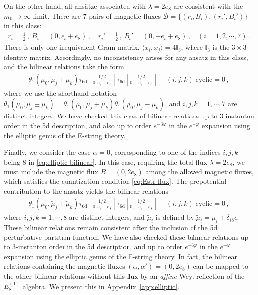 \documentclass[11pt, a4paper]{article}
\newcommand{\tauftnd}[2]{\tau_{\mathrm{6d}}\genfrac[]{0pt}{1}{#1}{#2}}
\theoremstyle{definition}
\begin{document}
On the other hand, all ans\"atze associated with $ \lambda=2e_8 $ are consistent with the $ m_0 \to \infty $ limit. There are 7 pairs of magnetic fluxes $ \mathcal{B} = \{(r_i,B_i), (r_i',B_i')\} $ in this class:
\begin{align}
    r_i = \frac{1}{2} \, , \ B_i = (0, e_i+e_8) \, , \quad
    r_i' = \frac{1}{2} \, , \ B_i' = (0, -e_i+e_8) \, , \quad
    (i = 1,2,\cdots,7) \, .
\end{align}
There is only one inequivalent Gram matrix, $ \langle x_i, x_j \rangle = 4\mathbb{I}_3 $, where $ \mathbb{I}_3 $ is the $ 3\times 3 $ identity matrix. Accordingly, no inconsistency arises for any ansatz in this class, and the bilinear relations take the form
\begin{align}\label{eq:elliptic-bilinear}
    \theta_1(\mu_0, \mu_j\pm \mu_k) \tauftnd{1/2}{0, e_i+e_8} \tauftnd{1/2}{0, -e_i+e_8} + (i,j,k)\text{-cyclic} = 0 \, ,
\end{align}
where we use the shorthand notation $ \theta_1(\mu_0, \mu_j\pm \mu_k) = \theta_1(\mu_0, \mu_j+\mu_k) \theta_1(\mu_0, \mu_j-\mu_k) $, and $ i,j,k=1,\cdots, 7 $ are distinct integers. We have checked this class of bilinear relations up to 3-instanton order in the 5d description, and also up to order $ e^{-3\varphi} $ in the $ e^{-\varphi} $ expansion using the elliptic genus of the E-string theory.

Finally, we consider the case $ \alpha=0 $, corresponding to one of the indices $ i,j,k $ being $ 8 $ in \eqref{eq:elliptic-bilinear}. In this case, requiring the total flux $ \lambda=2e_8 $, we must include the magnetic flux $ B=(0,2e_8) $ among the allowed magnetic fluxes, which satisfies the quantization condition \eqref{eq:Estr-flux}. The prepotential contribution to the ansatz yields the bilinear relations
\begin{align}\label{eq:elliptic-bilinear-affine}
    \theta_1(\mu_0, \tilde{\mu}_j \pm \tilde{\mu}_k) \tauftnd{1/2}{0, e_i+e_8} \tauftnd{1/2}{0, -e_i+e_8} + (i,j,k)\text{-cyclic} = 0 \, ,
\end{align}
where $ i,j,k=1,\cdots,8 $ are distinct integers, and $ \tilde{\mu}_i $ is defined by $ \tilde{\mu}_i=\mu_i + \delta_{i8} \epsilon $. These bilinear relations remain consistent after the inclusion of the 5d perturbative partition function. We have also checked these bilinear relations up to 3-instanton order in the 5d description, and up to order $ e^{-3\varphi} $ in the $ e^{-\varphi} $ expansion using the elliptic genus of the E-string theory. In fact, the bilinear relations containing the magnetic fluxes $ (\alpha,\alpha')=(0,2e_8) $ can be mapped to the other bilinear relations without this flux by an \emph{affine} Weyl reflection of the $ E_8^{(1)} $ algebra. We present this in Appendix~\ref{app:elliptic}.
\end{document}
